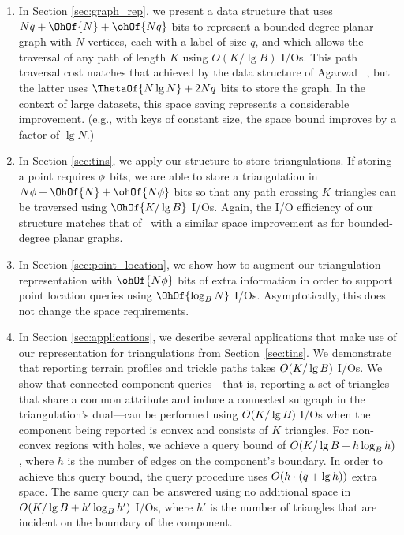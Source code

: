 {\begin{enumerate}
\item In Section \ref{sec:graph_rep}, we present a data structure that
  uses $Nq + \OhOf{N} + \ohOf{Nq}$ bits to represent a bounded degree 
  planar graph with $N$
  vertices, each with a label of size $q$, and which allows the traversal of
  any path of length $K$ using $O(K / \lg B)$ I/Os.
  This path traversal cost matches that achieved by the data structure of
  Agarwal \etal~\cite{DBLP:conf/soda/AgarwalAMVV98}, but the latter
  uses $\ThetaOf{N \lg N} + 2Nq$ bits to store the graph.
  In the context of large datasets, this space saving represents a
  considerable improvement.
  (e.g., with keys of constant size, the space bound improves by
  a factor of $\lg N$.)
\item In Section \ref{sec:tins}, we apply our structure to store
  triangulations.
  If storing a point requires $\phi$ bits, we are able to store a triangulation in
  $N \bitsPerPoint + \OhOf{N} + \ohOf{N \bitsPerPoint}$ bits so that any path crossing $K$
  triangles can be traversed using $\OhOf{K / \lg B}$ I/Os.
  Again, the I/O efficiency of our structure matches that
  of~\cite{DBLP:conf/soda/AgarwalAMVV98} with a similar space improvement
  as for bounded-degree planar graphs.
\item In Section \ref{sec:point_location}, we show how to
  augment our triangulation representation with $\ohOf{N\bitsPerPoint}$ bits of extra
  information in order to support point location 
  queries using $\OhOf{\log_B N}$ I/Os.
  Asymptotically, this does not change the space requirements.
\item In Section \ref{sec:applications}, we describe several
  applications that make use of our representation for triangulations
  from Section~\ref{sec:tins}.
  We demonstrate that reporting terrain profiles and trickle paths takes
  $O\!\left(K / \lg B\right)$ I/Os.
  We show that connected-component queries---that is, reporting a set of
  triangles that share a common attribute and induce a connected
  subgraph in the triangulation's dual---can be performed using
  $O\!\left(K / \lg B\right)$ I/Os when the component being reported is convex and consists
  of $K$ triangles.
  For non-convex regions with holes, we achieve a query bound of
  $O\!\left(K / \lg B + h \log_B h\right)$, where $h$ is the number
  of edges on the component's boundary.
  In order to achieve this query bound, the query procedure uses
  $O\!\left(h \cdot (q + \lg h)\right)$ extra space.
  The same query can be answered using no additional space in 
  $O\!\left(K / \lg B + h' \log_B h'\right)$ I/Os, where $h'$ is the number of
  triangles that are incident on the boundary of the component.
\end{enumerate}


}
